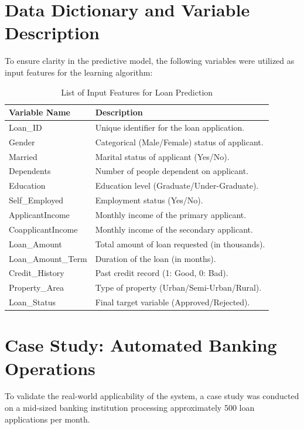 \documentclass[conference]{IEEEtran}
\begin{document}
\section{Data Dictionary and Variable Description}
To ensure clarity in the predictive model, the following variables were utilized as input features for the learning algorithm:

\begin{table}[htbp]
\caption{List of Input Features for Loan Prediction}
\begin{center}
\begin{tabular}{|l|l|}
\hline
\textbf{Variable Name} & \textbf{Description} \\
\hline
Loan\_ID & Unique identifier for the loan application. \\
\hline
Gender & Categorical (Male/Female) status of applicant. \\
\hline
Married & Marital status of applicant (Yes/No). \\
\hline
Dependents & Number of people dependent on applicant. \\
\hline
Education & Education level (Graduate/Under-Graduate). \\
\hline
Self\_Employed & Employment status (Yes/No). \\
\hline
ApplicantIncome & Monthly income of the primary applicant. \\
\hline
CoapplicantIncome & Monthly income of the secondary applicant. \\
\hline
Loan\_Amount & Total amount of loan requested (in thousands). \\
\hline
Loan\_Amount\_Term & Duration of the loan (in months). \\
\hline
Credit\_History & Past credit record (1: Good, 0: Bad). \\
\hline
Property\_Area & Type of property (Urban/Semi-Urban/Rural). \\
\hline
Loan\_Status & Final target variable (Approved/Rejected). \\
\hline
\end{tabular}
\label{tab:dictionary}
\end{center}
\end{table}

\section{Case Study: Automated Banking Operations}
To validate the real-world applicability of the system, a case study was conducted on a mid-sized banking institution processing approximately 500 loan applications per month. 
\end{document}
